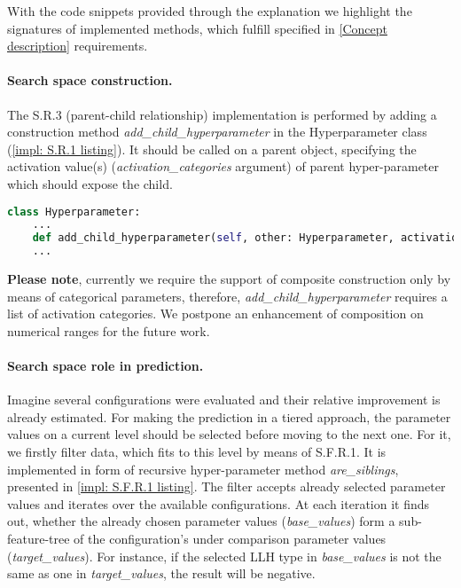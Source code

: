 With the code snippets provided through the explanation we highlight the signatures of implemented methods, which fulfill specified in \cref{Concept description} requirements.

\paragraph{Search space construction.} The S.R.3 (parent-child relationship) implementation is performed by adding a construction method \emph{add\_child\_hyperparameter} in the Hyperparameter class (\cref{impl: S.R.1 listing}). It should be called on a parent object, specifying the activation value(s) (\emph{activation\_categories} argument) of parent hyper-parameter which should expose the child. 

\begin{lstlisting}[language=Python, caption=S.R.1 implementation., label=impl: S.R.1 listing]
class Hyperparameter:
	...
	def add_child_hyperparameter(self, other: Hyperparameter, activation_categories: Iterable[CATEGORY]) -> Hyperparameter
	...
\end{lstlisting}

\textbf{Please note}, currently we require the support of composite construction only by means of categorical parameters, therefore, \emph{add\_child\_hyperparameter} requires a list of activation categories. We postpone an enhancement of composition on numerical ranges for the future work.

\paragraph{Search space role in prediction.}
Imagine several configurations were evaluated and their relative improvement is already estimated. For making the prediction in a tiered approach, the parameter values on a current level should be selected before moving to the next one. For it, we firstly filter data, which fits to this level by means of S.F.R.1. It is implemented in form of recursive hyper-parameter method \emph{are\_siblings}, presented in \cref{impl: S.F.R.1 listing}. The filter accepts already selected parameter values and iterates over the available configurations. At each iteration it finds out, whether the already chosen parameter values (\emph{base\_values}) form a sub-feature-tree of the configuration's under comparison parameter values (\emph{target\_values}). For instance, if the selected LLH type in \emph{base\_values} is not the same as one in \emph{target\_values}, the result will be negative.

